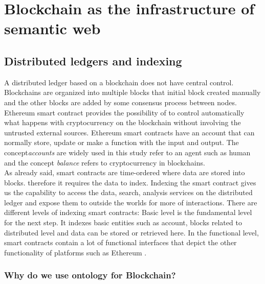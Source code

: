 \chapter{Blockchain as the infrastructure of semantic web}

\section{Distributed ledgers and indexing}
A distributed ledger based on a blockchain does not have central control. Blockchains are organized into multiple blocks that initial block created manually and the other blocks are added by some consensus process between nodes.
Ethereum smart contract provides the possibility of to control automatically what happens with cryptocurrency on the blockchain without involving the untrusted external sources. Ethereum smart contracts have an account that can normally store, update or make a function with the input and output.
The concept\textit{accounts} are widely used in this study refer to an agent such as human and the concept \textit{balance} refers to cryptocurrency in blockchains. \\ 
As already said, smart contracts are time-ordered where data are stored into blocks. therefore it requires the data to index. Indexing the smart contract gives us the capability to access the data, search, analysis services on the distributed ledger and expose them to outside the worlds for more of interactions.
There are different levels of indexing smart contracts: Basic level is the fundamental level for the next step. It indexes basic entities such as account, blocks related to distributed level and data can be stored or retrieved here. In the functional level, smart contracts contain a lot of functional interfaces that depict the other functionality of platforms such as Ethereum \cite{Third}. 

\subsection{Why do we use ontology for Blockchain?}

